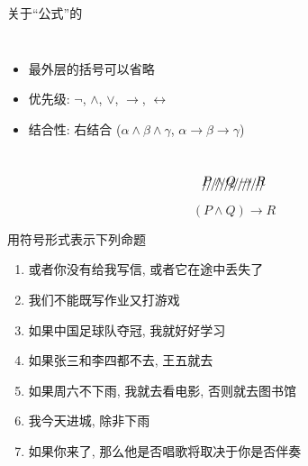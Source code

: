 \begin{frame}{}
  \begin{center}
    关于``公式''的

    \vspace{0.60cm}
    \begin{columns}
        \begin{itemize}
          \setlength{\itemsep}{6pt}
          \item 最外层的括号可以省略
          \item 优先级: $\lnot$, $\land$, $\lor$, $\to$, $\leftrightarrow$
          \item 结合性: 右结合 ($\alpha \land \beta \land \gamma$,
            $\alpha \to \beta \to \gamma$)
        \end{itemize}
    \end{columns}

    \pause
    \vspace{1.00cm}

    \[
      \xout{P \land Q \to R}
    \]
    \[
      (P \land Q) \to R
    \]
  \end{center}
\end{frame}

\begin{frame}{}
  \begin{exampleblock}{用符号形式表示下列命题}
    \begin{enumerate}[<+->][(1)]
      \setlength{\itemsep}{8pt}
      \item 或者你没有给我写信, 或者它在途中丢失了
      \item 我们不能既写作业又打游戏
      \item 如果中国足球队夺冠, 我就好好学习
      \item 如果张三和李四都不去, 王五就去
      \item 如果周六不下雨, 我就去看电影, 否则就去图书馆
      \item 我今天进城, 除非下雨
      \item 如果你来了, 那么他是否唱歌将取决于你是否伴奏
    \end{enumerate}
  \end{exampleblock}
\end{frame}
